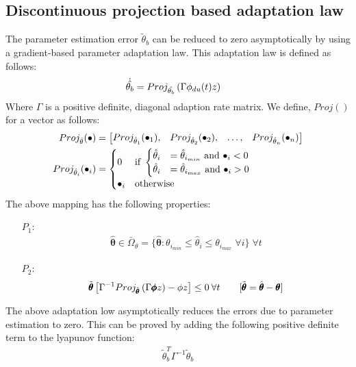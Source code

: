 \subsection{Discontinuous projection based adaptation law}
The parameter estimation error $\tilde \theta_b$ can be reduced to zero asymptotically by using a gradient-based parameter adaptation law. This adaptation law is defined as follows:
\begin{align}
    \dot{\hat{\theta_b}} &= Proj_{\hat{\theta_b}}\left( \Gamma \phi_{du}(t) z \right)
\end{align}
Where $\Gamma$ is a positive definite, diagonal adaption rate matrix.
We define,  $Proj()$ for a vector as follows:
\begin{align}
    Proj_{\hat{\theta}} (\bullet) &= \begin{bmatrix} Proj_{\hat \theta_1}(\bullet_1), &
                                        Proj_{\hat \theta_2}(\bullet_2), &
                                        \hdots, &
                                        Proj_{\hat \theta_n}(\bullet_n) \end{bmatrix}\\
    Proj_{\hat \theta_i}(\bullet_i)
    &= \begin{cases}
        0 & \text{if } \begin{cases}
                        \hat \theta_i &= \hat \theta_{i_{min}} \text{  and  } \bullet_i < 0\\
                        \hat \theta_i &= \hat \theta_{i_{max}} \text{  and  } \bullet_i > 0\\
                       \end{cases}\\
        \bullet_i & \text{otherwise}
    \end{cases}
\end{align}
The above mapping has the following properties:
\begin{itemize}
    \item[$P_1$:]
    \begin{align}
        \hat{\pmb \theta} \in \bar \Omega_{\theta}=\{\hat{\pmb \theta} :
        \theta_{i_{min}} \leq \hat \theta_i \leq \theta_{i_{max}} \; \forall
        i\} \; \forall t
    \end{align}

    \item[$P_2$:]
    \begin{align}
        \tilde{\pmb{\theta}} \left[ \Gamma^{-1} Proj_{\hat{\pmb\theta}}
        \left( \Gamma \pmb \phi z \right) - \phi z \right] \leq 0 \: \forall t \qquad
        [\tilde{\pmb{\theta}} = \hat{\pmb\theta} - \pmb \theta]
    \end{align}
\end{itemize}

The above adaptation low asymptotically reduces the errors due to parameter
estimation to zero. This can be proved by adding the following positive
definite term to the lyapunov function:
\begin{align*}
    \tilde \theta_b^T \Gamma^{-1} \tilde \theta_b
\end{align*}


